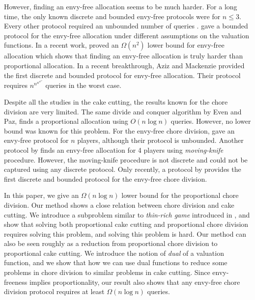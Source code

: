 However, finding an envy-free allocation seems to be much harder. For a long time, the only known discrete and bounded envy-free protocols were for $n \le 3$. Every other protocol required an unbounded number of queries \cite{brams1995envy,pikhurko2000envy}.  gave a bounded protocol for the envy-free allocation under different assumptions on the valuation functions. In a recent work,  proved an $\Omega(n^2)$ lower bound for envy-free allocation which shows that finding an envy-free allocation is truly harder than proportional allocation. In a recent breakthrough, Aziz and Mackenzie \cite{aziz4,azizn} provided the first discrete and bounded protocol for envy-free allocation. Their protocol requires $n^{n^{n^{n^{n^n}}}}$ queries in the worst case.

Despite all the studies in the cake cutting, the results known for the chore division are very limited. The same divide and conquer algorithm by Even and Paz, finds a proportional allocation using $O( n \log n)$ queries. However, no lower bound was known for this problem. For the envy-free chore division,  gave an envy-free protocol for $n$ players, although their protocol is unbounded. Another protocol by  finds an envy-free allocation for 4 players using \textit{moving-knife} procedure. However, the moving-knife procedure is not discrete and could not be captured using any discrete protocol. Only recently, a protocol by  provides the first discrete and bounded protocol for the envy-free chore division. 

In this paper, we give an $\Omega( n \log n)$  lower bound for the proportional chore division. Our method shows a close relation between chore division and cake cutting. We introduce a subproblem similar to \textit{thin-rich game} introduced in \cite{edmonds2006cake}, and show that solving both proportional cake cutting and proportional chore division requires solving this problem, and solving this problem is hard. Our method can also be seen roughly as a reduction from proportional chore division to proportional cake cutting. We introduce the notion of \textit{dual} of a valuation function, and we show that how we can use dual functions to reduce some problems in chore division to similar problems in cake cutting. Since envy-freeness implies proportionality, our result also shows that any envy-free chore division protocol requires at least $\Omega( n \log n)$ queries.

